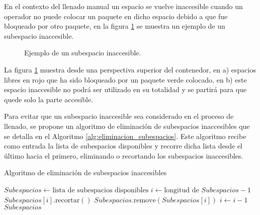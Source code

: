 En el contexto del llenado manual un espacio se vuelve inaccesible cuando un operador no puede colocar un paquete en dicho espacio debido a que fue bloqueado por otro paquete, en la figura \ref{fig:subespacio_inaccesible} se muestra un ejemplo de un subespacio inaccesible.

\begin{figure}[H]
    \centering
    
    \caption{Ejemplo de un subespacio inaccesible.}
    \label{fig:subespacio_inaccesible}
\end{figure}

La figura \ref{fig:subespacio_inaccesible} muestra desde una perspectiva superior del contenedor, en a) espacios libres en rojo que ha sido bloqueado por un paquete verde colocado, en b) este espacio inaccesible no podrá ser utilizado en su totalidad y se partirá para que quede solo la parte accesible.

Para evitar que un subespacio inaccesible sea considerado en el proceso de llenado, se propone un algoritmo de eliminación de subespacios inaccesibles que se detalla en el Algoritmo \ref{alg:eliminacion_subespacios}. Este algoritmo recibe como entrada la lista de subespacios disponibles y recorre dicha lista desde el último hacia el primero, eliminando o recortando los subespacios inaccesibles.

\begin{algorithm}[H]
    \caption{Algoritmo de eliminación de subespacios inaccesibles}
    \label{alg:eliminacion_subespacios}
    \begin{algorithmic}[1]
        \State $Subespacios \gets \text{lista de subespacios disponibles}$
        \State $i \gets \text{longitud de } Subespacios - 1$
        \State $Subespacios[i].\text{recortar}()$
        \State $Subespacios.\text{remove}(Subespacios[i])$
        \EndIf
        \State $i \gets i - 1$
        \EndWhile
        \State \Return $Subespacios$
    \end{algorithmic}
\end{algorithm}

